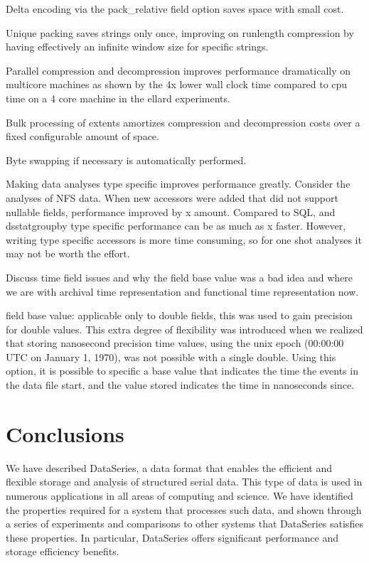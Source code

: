 \documentclass{acm_proc_article-sp}
\begin{document}
Delta encoding via the pack\_relative field option saves space
with small cost.

Unique packing saves strings only once, improving on runlength
compression by having effectively an infinite window size for specific
strings.

Parallel compression and decompression improves performance
dramatically on multicore machines as shown by the 4x lower wall clock
time compared to cpu time on a 4 core machine in the ellard experiments.

Bulk processing of extents amortizes compression and decompression
costs over a fixed configurable amount of space.

Byte swapping if necessary is automatically performed.

Making data analyses type specific improves performance greatly.
Consider the analyses of NFS data.  When new accessors were added that
did not support nullable fields, performance improved by x amount.
Compared to SQL, and dsstatgroupby type specific performance can be as
much as x faster.  However, writing type specific accessors is more
time consuming, so for one shot analyses it may not be worth the
effort.

Discuss time field issues and why the field base value was a bad idea
and where we are with archival time representation and functional time
representation now.

field base value: applicable only to double fields,
this was used to gain precision for double values. This extra degree
of flexibility was introduced when we realized that storing nanosecond
precision time values, using the unix epoch (00:00:00 UTC on January
1, 1970), was not possible with a single double. Using this option, it
is possible to specific a base value that indicates the time the
events in the data file start, and the value stored indicates the time
in nanoseconds since.

\fi


\section{Conclusions}\label{sec:conclusions}

We have described DataSeries, a data format that enables the efficient
and flexible storage and analysis
of structured serial data. This type of data is
used in numerous applications in all areas of computing and
science. We have identified the properties required for a system that
processes such data, and shown through a series of experiments and
comparisons to other systems that DataSeries satisfies these
properties. In particular, DataSeries offers significant performance
and storage efficiency benefits.  
\end{document}

